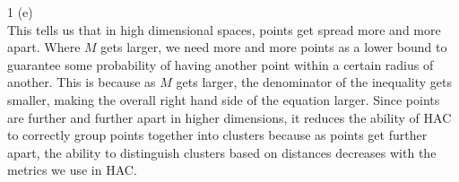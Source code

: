 \documentclass[12pt]{scrartcl}
\begin{document}
1 (e) \\

This tells us that in high dimensional spaces, points get spread more and more apart. Where $M$ gets larger, we need more and more points as a lower bound to guarantee some probability of having another point within a certain radius of another. This is because as $M$ gets larger, the denominator of the inequality gets smaller, making the overall right hand side of the equation larger. Since points are further and further apart in higher dimensions, it reduces the ability of HAC to correctly group points together into clusters because  as points get further apart, the ability to distinguish clusters based on distances decreases with the metrics we use in HAC.
\end{document}
